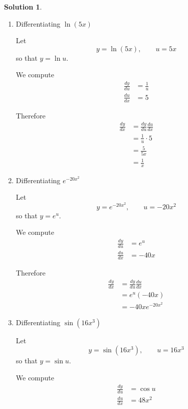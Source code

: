 \documentclass[a4paper]{article}
\theoremstyle{plain} %
\theoremstyle{definition} %
\newtheorem*{solution}{Solution}
\numberwithin{equation}{subsection}
\begin{document}
\begin{solution}

\begin{enumerate}
    \item Differentiating $\ln(5x)$

    Let
    \[
        y = \ln(5x), \qquad u = 5x
    \]
    so that $y = \ln u$.

    We compute
    \begin{align*}
        \frac{dy}{du} &= \frac{1}{u} \tag{using the derivative of $\ln u$}\\
        \frac{du}{dx} &= 5 \tag{using the derivative of $5x$}
    \end{align*}

    Therefore
    \begin{align*}
        \frac{dy}{dx} &= \frac{dy}{du}\frac{du}{dx}\\
        &= \frac{1}{u}\cdot 5\\
        &= \frac{5}{5x}\\
        &= \frac{1}{x}
    \end{align*}

    \item Differentiating $e^{-20x^2}$

    Let
    \[
        y = e^{-20x^2}, \qquad u = -20x^2
    \]
    so that $y = e^u$.

    We compute
    \begin{align*}
        \frac{dy}{du} &= e^u \tag{using the derivative of $e^u$}\\
        \frac{du}{dx} &= -40x \tag{using the derivative of $-20x^2$}
    \end{align*}

    Therefore
    \begin{align*}
        \frac{dy}{dx} &= \frac{dy}{du}\frac{du}{dx}\\
        &= e^u(-40x)\\
        &= -40x e^{-20x^2}
    \end{align*}

    \item Differentiating $\sin(16x^3)$

    Let
    \[
        y = \sin(16x^3), \qquad u = 16x^3
    \]
    so that $y = \sin u$.

    We compute
    \begin{align*}
        \frac{dy}{du} &= \cos u \tag{using the derivative of $\sin u$}\\
        \frac{du}{dx} &= 48x^2 \tag{using the derivative of $16x^3$}
    \end{align*}


\end{enumerate}
\end{solution}
\end{document}
